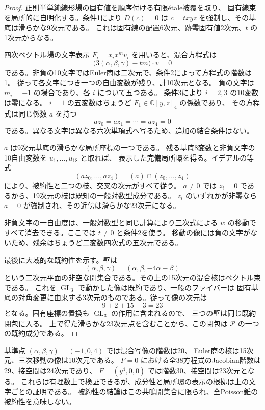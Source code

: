 \begin{proof}
正則半単純線形場の固有値を順序付ける有限\'etale被覆を取り、
固有線束を局所的に自明化する。条件1により
$D(c)=0$ は $c=txyz$ を強制し、その基底は滑らかな9次元である。
これは固有線の配置6次元、跡零固有値2次元、$t$ の1次元からなる。

四次ベクトル場の文字表示 $F_i=x_i x^m v_i$ を用いると、混合方程式は
\[
 \bigl(3(\alpha,\beta,\gamma)-tm\bigr)\cdot v=0
\]
である。非負の10文字ではEuler商は二次元で、条件2によって方程式の階数は1。
従って各文字につき一つの自由変数が残り、計10次元となる。
負の文字は $m_i=-1$ の場合であり、各 $i$ について五つある。
条件3により $i=2,3$ の10変数は零になる。
$i=1$ の五変数はちょうど $F_1\in\mathbb C[y,z]_4$ の係数であり、
その方程式は同じ係数 $a$ を持つ
\[
 az_0=az_1=\cdots=az_4=0
\]
である。異なる文字は異なる六次単項式へ写るため、追加の結合条件はない。

$a$ は9次元基底の滑らかな局所座標の一つである。
残る基底8変数と非負文字の10自由変数を $u_1,\ldots,u_{18}$ と取れば、
表示した完備局所環を得る。イデアルの等式
\[
 (az_0,\ldots,az_4)=(a)\cap(z_0,\ldots,z_4)
\]
により、被約性と二つの枝、交叉の次元がすべて従う。
$a\neq0$ では $z_i=0$ であるから、19次元の枝は既知の一般対数型成分である。
$z_i$ のいずれかが非零なら $a=0$ が強制され、その近傍は滑らかな23次元になる。

非負文字の一自由度は、一般対数型と同じ計算により三次式による $w$ の移動で
すべて消去できる。ここでは $t\neq0$ と条件2を使う。
移動の像には負の文字がないため、残余はちょうど二変数四次式の五次元である。

最後に大域的な既約性を示す。壁は
\[
 (\alpha,\beta,\gamma)=(\alpha,\beta,-4\alpha-\beta)
\]
という二次元平面の非空な開集合である。その上の15次元の混合核はベクトル束である。
これを $\operatorname{GL}_3$ で動かした像は既約であり、一般のファイバーは
固有基底の対角変更に由来する3次元のものである。従って像の次元は
\[
 9+2+15-3=23
\]
となる。固有座標の置換も $\operatorname{GL}_3$ の作用に含まれるので、
三つの壁は同じ既約閉包に入る。
上で得た滑らかな23次元点を含むことから、この閉包は
$\mathscr P$ の一つの既約成分である。
\end{proof}

\begin{remark}[検証と量化]
基準点 $(\alpha,\beta,\gamma)=(-1,0,4)$ では混合写像の階数は20、
Euler商の核は15次元、三次移動の像は10次元である。
$F=0$ における全38方程式のJacobian階数は29、接空間は24次元であり、
$F=(y^4,0,0)$ では階数30、接空間は23次元となる。
これらは有理数上で検証できるが、成分性と局所環の表示の根拠は上の文字ごとの証明である。
被約性の結論はこの共鳴開集合に限られ、全Poisson錐の被約性を意味しない。
\end{remark}

